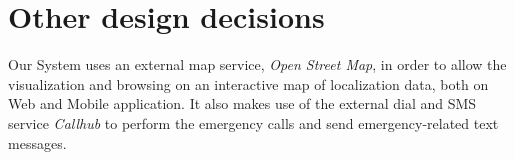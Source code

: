 \section{Other design decisions}

Our System uses an external map service, \emph{Open Street Map}, in order to allow the visualization and browsing on an interactive map of localization data, both on Web and Mobile application. It also makes use of the external dial and SMS service \emph{Callhub} to perform the emergency calls and send emergency-related text messages.
